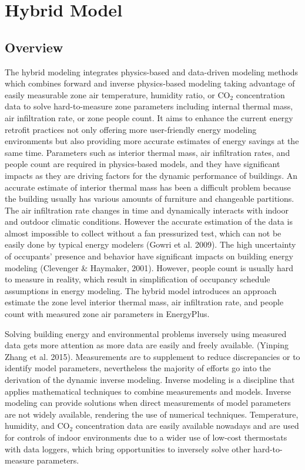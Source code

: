 \section{Hybrid Model}\label{hybrid-model}

\subsection{Overview}

The hybrid modeling integrates physics-based and data-driven modeling methods which combines forward and inverse physics-based modeling taking advantage of easily measurable zone air temperature, humidity ratio, or CO$_2$ concentration data to solve hard-to-measure zone parameters including internal thermal mass, air infiltration rate, or zone people count. It aims to enhance the current energy retrofit practices not only offering more user-friendly energy modeling environments but also providing more accurate estimates of energy savings at the same time. Parameters such as interior thermal mass, air infiltration rates, and people count are required in physics-based models, and they have significant impacts as they are driving factors for the dynamic performance of buildings. An accurate estimate of interior thermal mass has been a difficult problem because the building usually has various amounts of furniture and changeable partitions. The air infiltration rate changes in time and dynamically interacts with indoor and outdoor climatic conditions. However the accurate estimation of the data is almost impossible to collect without a fan pressurized test, which can not be easily done by typical energy modelers (Gowri et al. 2009). The high uncertainty of occupants’ presence and behavior have significant impacts on building energy modeling (Clevenger \& Haymaker, 2001). However, people count is usually hard to measure in reality, which result in simplification of occupancy schedule assumptions in energy modeling. The hybrid model introduces an approach estimate the zone level interior thermal mass, air infiltration rate, and people count with measured zone air parameters in EnergyPlus.

Solving building energy and environmental problems inversely using measured data gets more attention as more data are easily and freely available. (Yinping Zhang et al. 2015). Measurements are to supplement to reduce discrepancies or to identify model parameters, nevertheless the majority of efforts go into the derivation of the dynamic inverse modeling. Inverse modeling is a discipline that applies mathematical techniques to combine measurements and models. Inverse modeling can provide solutions when direct measurements of model parameters are not widely available, rendering the use of numerical techniques. Temperature, humidity, and CO$_2$ concentration data are easily available nowadays and are used for controls of indoor environments due to a wider use of low-cost thermostats with data loggers, which bring opportunities to inversely solve other hard-to-measure parameters.

